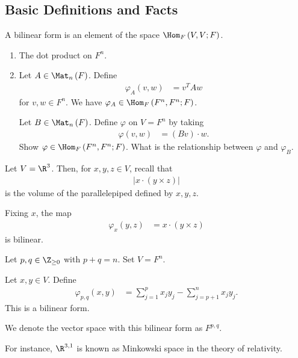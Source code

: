 \documentclass[10pt]{mypackage}
\begin{document}
  \subsection{Basic Definitions and Facts}%
  \begin{definition}
    A bilinear form is an element of the space $\Hom_{F}\left(V,V;F\right)$.
  \end{definition}
  \begin{example}\hfill
    \begin{enumerate}[(1)]
      \item The dot product on $F^n$.
      \item Let $A\in \Mat_{n}\left(F\right)$. Define
        \begin{align*}
          \varphi_{A}\left(v,w\right) &= v^{T}Aw
        \end{align*}
        for $v,w\in F^n$. We have $\varphi_{A}\in \Hom_{F}\left(F^n,F^n;F\right)$.
  \begin{exercise}
    Let $B\in \Mat_{n}\left(F\right)$. Define $\varphi$ on $V = F^n$ by taking
    \begin{align*}
      \varphi\left(v,w\right) &= \left(Bv\right)\cdot w.
    \end{align*}
    Show $\varphi\in \Hom_{F}\left(F^n,F^n;F\right)$. What is the relationship between $\varphi$ and $\varphi_{B}$.
  \end{exercise}
    \end{enumerate}
  \end{example}
  \begin{example}
    Let $V = \R^3$. Then, for $x,y,z\in V$, recall that
    \begin{align*}
      \left\vert x\cdot \left(y\times z\right) \right\vert
    \end{align*}
    is the volume of the parallelepiped defined by $x,y,z$.\newline

    Fixing $x$, the map
    \begin{align*}
      \varphi_{x}\left(y,z\right) &= x\cdot \left(y\times z\right)
    \end{align*}
    is bilinear.
  \end{example}
  \begin{example}
    Let $p,q\in \Z_{\geq 0}$ with $p+q = n$. Set $V = F^n$.\newline

    Let $x,y\in V$. Define
    \begin{align*}
      \varphi_{p,q}\left(x,y\right) &= \sum_{j=1}^{p}x_jy_j - \sum_{j=p+1}^{n}x_jy_j.
    \end{align*}
    This is a bilinear form.\newline

    We denote the vector space with this bilinear form as $F^{p,q}$.\newline

    For instance, $\R^{3,1}$ is known as Minkowski space in the theory of relativity.
  \end{example}
\end{document}
